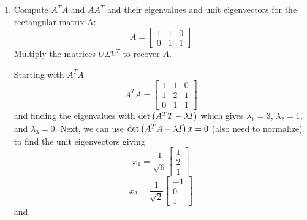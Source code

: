 \begin{enumerate}[label=\arabic*.]
    \item Compute $A^{T}A$ and $AA^{T}$ and their eigenvalues and unit
        eigenvectors for the rectangular matrix A:
        \begin{equation}
            A = 
            \begin{bmatrix}
                1 & 1 & 0 \\
                0 & 1 & 1
            \end{bmatrix}
        \end{equation}
        Multiply the matrices $U \Sigma V^{T}$ to recover $A$. 
        \begin{mdframed}[style=MyFrame]
            Starting with $A^{T}A$
            \begin{equation}
                A^{T}A = 
                \begin{bmatrix}
                    1       &       1   &       0       \\
                    1       &       2   &       1       \\
                    0       &       1   &       1
                \end{bmatrix}
            \end{equation}
            and finding the eigenvalues with
            $\text{det}\left(A^{T}T-\lambda I\right)$ which gives $\lambda_{1} =
            3$, $\lambda_{2} = 1$, and $\lambda_{3} = 0$. Next, we can use
            $\text{det}\left(A^{T}A - \lambda I\right)x = 0$ (also need to
            normalize) to find the unit eigenvectors giving 
            \begin{equation}
                x_{1} = 
                \frac{1}{\sqrt{6}}
                \begin{bmatrix}
                    1       \\
                    2       \\
                    1
                \end{bmatrix}
            \end{equation}
            \begin{equation}
                x_{2} =
               \frac{1}{\sqrt{2}}
                \begin{bmatrix}
                    -1      \\
                    0       \\
                    1
                \end{bmatrix}
            \end{equation}
            and

\end{mdframed}
\end{enumerate}
